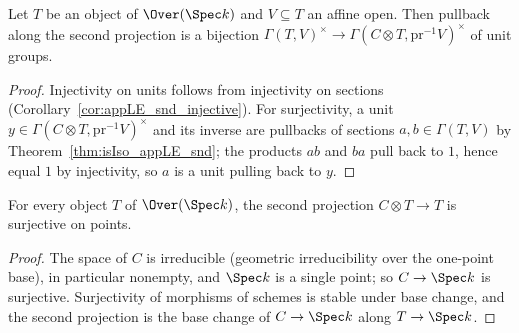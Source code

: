 \begin{corollary}
  \label{cor:unitsAppLE_snd_bijective}
  \leanok
  Let \(T\) be an object of \(\Over(\Spec k)\) and \(V \subseteq T\) an affine open. Then
  pullback along the second projection is a bijection
  \(\Gamma(T, V)^{\times} \to \Gamma(C \otimes T, \mathrm{pr}^{-1}V)^{\times}\) of unit
  groups.
\end{corollary}
\begin{proof}
  \leanok
  Injectivity on units follows from injectivity on sections
  (Corollary~\ref{cor:appLE_snd_injective}). For surjectivity, a unit
  \(y \in \Gamma(C \otimes T, \mathrm{pr}^{-1}V)^{\times}\) and its inverse are pullbacks of
  sections \(a, b \in \Gamma(T,V)\) by Theorem~\ref{thm:isIso_appLE_snd}; the products
  \(ab\) and \(ba\) pull back to \(1\), hence equal \(1\) by injectivity, so \(a\) is a unit
  pulling back to \(y\).
\end{proof}

\begin{lemma}
  \label{lem:surjective_snd}
  \leanok
  For every object \(T\) of \(\Over(\Spec k)\), the second projection
  \(C \otimes T \to T\) is surjective on points.
\end{lemma}
\begin{proof}
  \leanok
  The space of \(C\) is irreducible (geometric irreducibility over the one-point base), in
  particular nonempty, and \(\Spec k\) is a single point; so \(C \to \Spec k\) is
  surjective. Surjectivity of morphisms of schemes is stable under base change, and the
  second projection is the base change of \(C \to \Spec k\) along \(T \to \Spec k\).
\end{proof}

